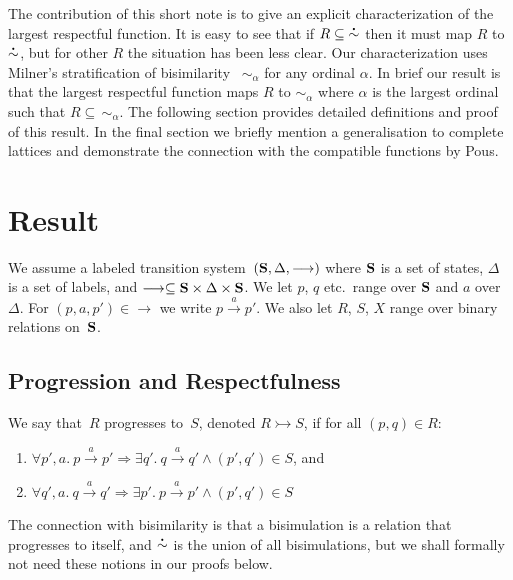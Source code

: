 \documentclass{CSML}
\theoremstyle{definition}
\newcommand{\act}{a}
\newcommand{\states}{{\bf S}}
\newcommand{\trans}[2]{{#1} \stackrel{\act}{\longrightarrow} {#2}}
\newcommand{\bisim}{\stackrel{\mbox{\bf .}}{\sim}}
\newcommand{\progress}{\rightarrowtail}
\begin{document}
The contribution of this short note is to give an explicit
characterization of the largest respectful function. It is easy to see
that if $R \subseteq \mathop{\bisim}$ then it must map $R$ to
$\bisim$, but for other $R$ the situation has been less clear. Our
characterization uses Milner's stratification of
bisimilarity~\cite{Milner1989} $\sim_\alpha$ for any ordinal
$\alpha$. In brief our result is that the largest respectful function
maps $R$ to $\sim_\alpha$ where $\alpha$ is the largest ordinal such
that $R \subseteq \,\sim_\alpha$.
The following section provides detailed definitions and proof of this
result. In the final section we briefly mention a generalisation to
complete lattices and demonstrate the connection with the compatible
functions by Pous.

\section{Result}

We assume a labeled transition system~$(\states, \Delta,
\longrightarrow)$ where ${\bf S}$ is a set of states, $\Delta$ is a
set of labels, and $\longrightarrow \subseteq \states \times \Delta
\times \states$. We let $p$, $q$ etc.\ range over $\states$ and $\act$
over $\Delta$. For $(p, a, p') \in \mathop{\longrightarrow}$ we write
$\trans{p}{p'}$. We also let $R$, $S$, $X$ range over binary relations
on~$\states$.

\subsection{Progression and Respectfulness}
\begin{defi}[Progress]
\label{progress}
We say that~$R$ progresses to~$S$, denoted $R \progress S$, if for all
$(p,q) \in R$:
\begin{enumerate}
\item $\forall p',\act.\ \trans{p}{p'} \Longrightarrow \exists
  q'.\ \trans{q}{q'} \wedge (p',q') \in S$, and
\item $\forall q',\act.\ \trans{q}{q'} \Longrightarrow \exists
  p'.\ \trans{p}{p'} \wedge (p',q') \in S$
\end{enumerate}
\end{defi}

The connection with bisimilarity is that a bisimulation is a relation
that progresses to itself, and $\bisim$ is the union of all
bisimulations, but we shall formally not need these notions in our
proofs below.
\end{document}
